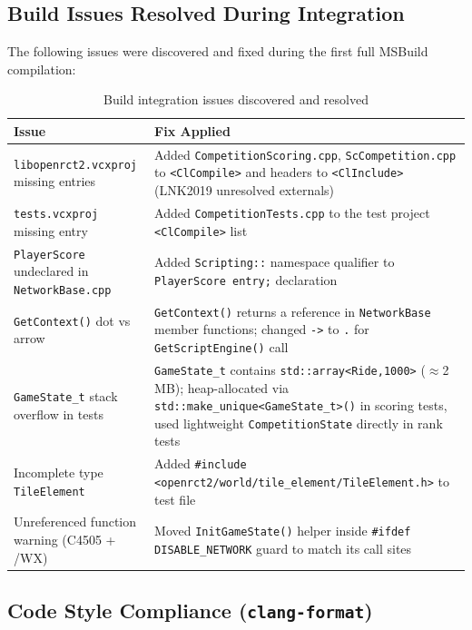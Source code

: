 \documentclass[12pt,a4paper]{article}
\begin{document}
\subsection{Build Issues Resolved During Integration}

The following issues were discovered and fixed during the first full MSBuild compilation:

\begin{table}[h!]
\centering
\begin{tabularx}{\linewidth}{lX}
\toprule
\textbf{Issue} & \textbf{Fix Applied} \\
\midrule
\texttt{libopenrct2.vcxproj} missing entries &
Added \texttt{CompetitionScoring.cpp}, \texttt{ScCompetition.cpp} to
\texttt{<ClCompile>} and headers to \texttt{<ClInclude>} (LNK2019 unresolved externals) \\
\texttt{tests.vcxproj} missing entry &
Added \texttt{CompetitionTests.cpp} to the test project \texttt{<ClCompile>} list \\
\texttt{PlayerScore} undeclared in \texttt{NetworkBase.cpp} &
Added \texttt{Scripting::} namespace qualifier to \texttt{PlayerScore entry;} declaration \\
\texttt{GetContext()} dot vs arrow &
\texttt{GetContext()} returns a reference in \texttt{NetworkBase} member functions;
changed \texttt{->} to \texttt{.} for \texttt{GetScriptEngine()} call \\
\texttt{GameState\_t} stack overflow in tests &
\texttt{GameState\_t} contains \texttt{std::array<Ride,1000>} ($\approx$2\,MB);
heap-allocated via \texttt{std::make\_unique<GameState\_t>()} in scoring tests,
used lightweight \texttt{CompetitionState} directly in rank tests \\
Incomplete type \texttt{TileElement} &
Added \texttt{\#include <openrct2/world/tile\_element/TileElement.h>} to test file \\
Unreferenced function warning (C4505 + /WX) &
Moved \texttt{InitGameState()} helper inside \texttt{\#ifdef DISABLE\_NETWORK} guard
to match its call sites \\
\bottomrule
\end{tabularx}
\caption{Build integration issues discovered and resolved}
\end{table}

\subsection{Code Style Compliance (\texttt{clang-format})}
\end{document}
